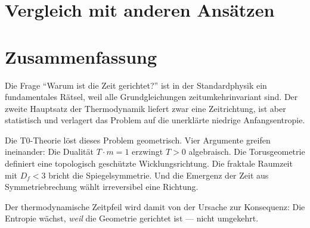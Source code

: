 \section{Vergleich mit anderen Ansätzen}

\begin{table}[htbp]
	\centering
	\caption{Vergleich verschiedener Erklärungen des Zeitpfeils}
\end{table}

\section{Zusammenfassung}

Die Frage ``Warum ist die Zeit gerichtet?'' ist in der Standardphysik ein fundamentales Rätsel, weil alle Grundgleichungen zeitumkehrinvariant sind. Der zweite Hauptsatz der Thermodynamik liefert zwar eine Zeitrichtung, ist aber statistisch und verlagert das Problem auf die unerklärte niedrige Anfangsentropie.

Die T0-Theorie löst dieses Problem geometrisch. Vier Argumente greifen ineinander: Die Dualität $T \cdot m = 1$ erzwingt $T > 0$ algebraisch. Die Torusgeometrie definiert eine topologisch geschützte Wicklungsrichtung. Die fraktale Raumzeit mit $D_f < 3$ bricht die Spiegelsymmetrie. Und die Emergenz der Zeit aus Symmetriebrechung wählt irreversibel eine Richtung.

Der thermodynamische Zeitpfeil wird damit von der Ursache zur Konsequenz: Die Entropie wächst, \emph{weil} die Geometrie gerichtet ist --- nicht umgekehrt.

